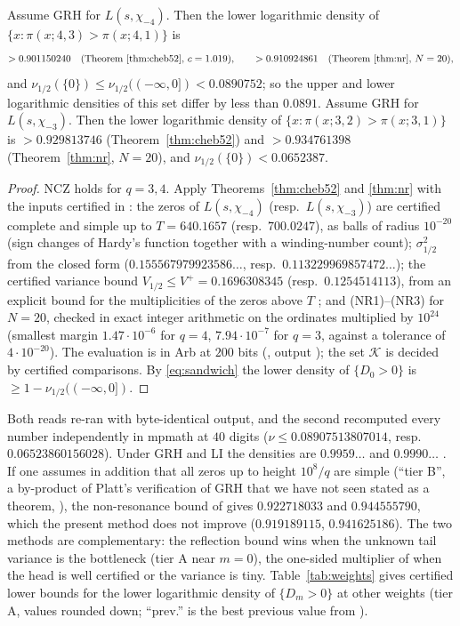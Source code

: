 \begin{theorem}\label{thm:cert}
Assume GRH for $L(s,\chi_{-4})$. Then the lower logarithmic density of $\{x:\pi(x;4,3)>\pi(x;4,1)\}$ is
\[
>0.901150240\quad\text{(Theorem~\ref{thm:cheb52}, $c=1.019$)},\qquad>0.910924861\quad\text{(Theorem~\ref{thm:nr}, $N=20$)},
\]
and $\nu_{1/2}(\{0\})\le\nu_{1/2}((-\infty,0])<0.0890752$; so the upper and lower logarithmic densities of this set differ by less than $0.0891$. Assume GRH for $L(s,\chi_{-3})$. Then the lower logarithmic density of $\{x:\pi(x;3,2)>\pi(x;3,1)\}$ is $>0.929813746$ (Theorem~\ref{thm:cheb52}) and $>0.934761398$ (Theorem~\ref{thm:nr}, $N=20$), and $\nu_{1/2}(\{0\})<0.0652387$.
\end{theorem}

\begin{proof}
NCZ holds for $q=3,4$. Apply Theorems~\ref{thm:cheb52} and \ref{thm:nr} with the inputs certified in \cite{GO}: the zeros of $L(s,\chi_{-4})$ (resp.\ $L(s,\chi_{-3})$) are certified complete and simple up to $T=640.1657$ (resp.\ $700.0247$), as balls of radius $10^{-20}$ (sign changes of Hardy's function together with a winding-number count); $\sigma_{1/2}^2$ from the closed form ($0.155567979923586\ldots$, resp.\ $0.113229969857472\ldots$); the certified variance bound $V_{1/2}\le V^+=0.1696308345$ (resp.\ $0.1254514113$), from an explicit bound for the multiplicities of the zeros above $T$ \cite[Proposition~4.4]{GO}; and (NR1)--(NR3) for $N=20$, checked in exact integer arithmetic on the ordinates multiplied by $10^{24}$ (smallest margin $1.47\cdot10^{-6}$ for $q=4$, $7.94\cdot10^{-7}$ for $q=3$, against a tolerance of $4\cdot10^{-20}$). The evaluation is in Arb \cite{Arb} at $200$ bits (, output ); the set $\mathcal K$ is decided by certified comparisons. By \eqref{eq:sandwich} the lower density of $\{D_0>0\}$ is $\ge1-\nu_{1/2}((-\infty,0])$.
\end{proof}

Both reads re-ran  with byte-identical output, and the second recomputed every number independently in mpmath at $40$ digits ($\nu\le0.08907513807014$, resp.\ $0.06523860156028$). Under GRH and LI the densities are $0.9959\ldots$ and $0.9990\ldots$ \cite{RS}. If one assumes in addition that all zeros up to height $10^8/q$ are simple (``tier B'', a by-product of Platt's verification of GRH \cite{Platt} that we have not seen stated as a theorem, \cite[Remark~4.6]{GO}), the non-resonance bound of \cite[Theorem~6.2]{GO} gives $0.922718033$ and $0.944555790$, which the present method does not improve ($0.919189115$, $0.941625186$). The two methods are complementary: the reflection bound wins when the unknown tail variance is the bottleneck (tier A near $m=0$), the one-sided multiplier of \cite{GO} when the head is well certified or the variance is tiny. Table~\ref{tab:weights} gives certified lower bounds for the lower logarithmic density of $\{D_m>0\}$ at other weights (tier A, values rounded down; ``prev.'' is the best previous value from \cite{GO}).

